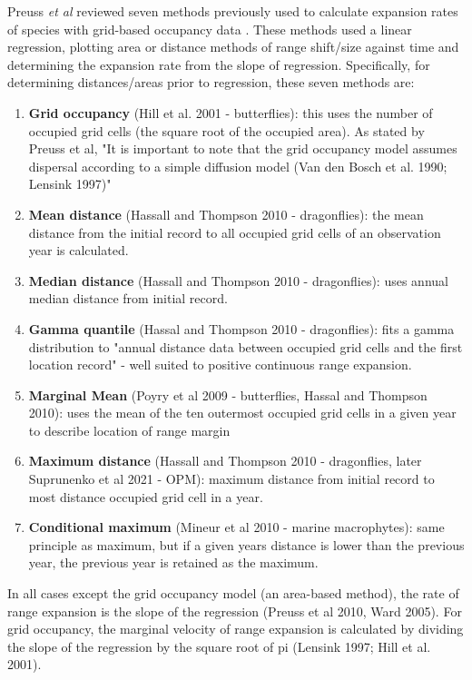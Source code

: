 \documentclass[9pt, reqno]{amsart}
\numberwithin{equation}{section}
\renewcommand{\(}{\left(}
\renewcommand{\)}{\right)}
\theoremstyle{definition}
\theoremstyle{definition}
\theoremstyle{definition}
\begin{document}
	Preuss \textit{et al} reviewed seven methods previously used to calculate expansion rates of species with grid-based occupancy data \cite{preuss_evaluating_2014}. These methods used a linear regression, plotting area or distance methods of range shift/size against time and determining the expansion rate from the slope of regression. Specifically, for determining distances/areas prior to regression, these seven methods are:
	\begin{enumerate}
		\item \textbf{Grid occupancy} (Hill et al. 2001 - butterflies): this uses the number of occupied grid cells (the square root of the occupied area). As stated by Preuss et al, "It is important to note that the grid occupancy model assumes dispersal according to a simple diffusion model (Van den Bosch et al. 1990; Lensink 1997)"
		\item \textbf{Mean distance} (Hassall and Thompson 2010 - dragonflies): the mean distance from the initial record to all occupied grid cells of an observation year is calculated.
		\item \textbf{Median distance} (Hassall and Thompson 2010 - dragonflies): uses annual median distance from initial record.
		\item \textbf{Gamma quantile} (Hassal and Thompson 2010 - dragonflies): fits a gamma distribution to "annual distance data between occupied grid cells and the first location record" - well suited to positive continuous range expansion.
		\item \textbf{Marginal Mean} (Poyry et al 2009 - butterflies, Hassal and Thompson 2010): uses the mean of the ten outermost occupied grid cells in a given year to describe location of range margin 
		\item \textbf{Maximum distance} (Hassall and Thompson 2010 - dragonflies, later Suprunenko et al 2021 - OPM): maximum distance from initial record to most distance occupied grid cell in a year.
		\item \textbf{Conditional maximum} (Mineur et al 2010 - marine macrophytes): same principle as maximum, but if a given years distance is lower than the previous year, the previous year is retained as the maximum. 
	\end{enumerate} 

	In all cases except the grid occupancy model (an area-based method), the rate of range expansion is the slope of the regression (Preuss et al 2010, Ward 2005). For grid occupancy, the marginal velocity of range expansion is calculated by dividing the slope of the regression by the square root of pi (Lensink 1997; Hill et al. 2001). \\
\end{document}
